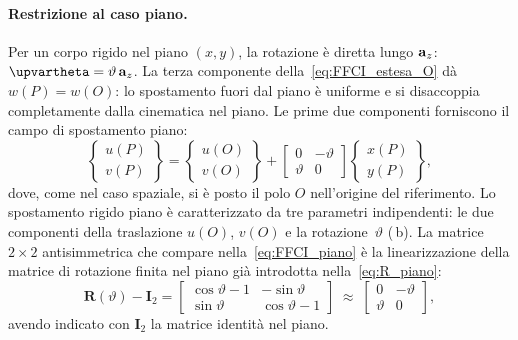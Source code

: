 \paragraph{Restrizione al caso piano.}
Per un corpo rigido nel piano $(x,y)$, la rotazione è diretta
lungo $\mathbf{a}_z$: $\bm{\upvartheta} = \vartheta\,\ab_z$.
La terza componente della~\eqref{eq:FFCI_estesa_O} dà
$w(P) = w(O)$: lo spostamento fuori dal piano è uniforme e si
disaccoppia completamente dalla cinematica nel piano. Le prime
due componenti forniscono il campo di spostamento piano:
\begin{equation}\label{eq:FFCI_piano}
	\begin{Bmatrix} u(P) \\ v(P) \end{Bmatrix}
	= \begin{Bmatrix} u(O) \\ v(O) \end{Bmatrix}
	+ \begin{bmatrix}
		0 & -\vartheta \\
		\vartheta & 0
	\end{bmatrix}
	\begin{Bmatrix}
		x(P) \\ y(P)
	\end{Bmatrix},
\end{equation}
dove, come nel caso spaziale, si è posto il polo $O$
nell'origine del riferimento. Lo spostamento rigido piano è
caratterizzato da tre parametri indipendenti: le due componenti
della traslazione $u(O)$, $v(O)$ e la rotazione~$\vartheta$ (\,b).
La matrice $2\times 2$ antisimmetrica che compare
nella~\eqref{eq:FFCI_piano} è la linearizzazione della matrice
di rotazione finita nel piano già introdotta
nella~\eqref{eq:R_piano}:
\begin{equation}
	\bm{R}(\vartheta) - \bm{I}_2
	= \begin{bmatrix}
		\cos\vartheta - 1 & -\sin\vartheta \\
		\sin\vartheta & \cos\vartheta - 1
	\end{bmatrix}
	\;\approx\;
	\begin{bmatrix} 0 & -\vartheta \\ \vartheta & 0
	\end{bmatrix},
\end{equation}
avendo indicato con $\bm{I}_2$ la matrice identità nel piano.




